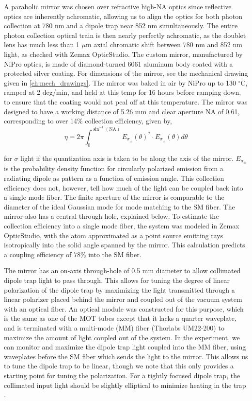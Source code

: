 A parabolic mirror was chosen over refractive high-NA optics since reflective optics are inherently achromatic, allowing us to align the optics for both photon collection at 780 nm and a dipole trap near 852 nm simultaneously. The entire photon collection optical train is then nearly perfectly achromatic, as the doublet lens has much less than 1 $\mu \mathrm{m}$ axial chromatic shift between 780 nm and 852 nm light, as checked with Zemax OpticStudio. The custom mirror, manufactured by NiPro optics, is made of diamond-turned 6061 aluminum body coated with a protected silver coating. For dimensions of the mirror, see the mechanical drawing given in \ref{ch:mech_drawings}. The mirror was baked in air by NiPro up to 130 $^{\circ}$C, ramped at 2 deg/min, and held at this temp for 16 hours before ramping down, to ensure that the coating would not peal off at this temperature. The mirror was designed to have a working distance of 5.26 mm and clear aperture NA of 0.61, corresponding to over 14$\%$ collection efficiency, given by,
\begin{equation}
    \eta = 2\pi\int_{0}^{\sin^{-1}(\text{NA})} E_{\sigma_{\pm}}(\theta)^{\ast} \cdot E_{\sigma_{\pm}}(\theta) d\theta 
\end{equation}

for $\sigma$ light if the quantization axis is taken to be along the axis of the mirror. $E_{\sigma_{\pm}}$ is the probability density function for circularly polarized emission from a radiating dipole as pattern as a function of emission angle. This collection efficiency does not, however, tell how much of the light can be coupled back into a single mode fiber. The finite aperture of the mirror is comparable to the diameter of the ideal Gaussian mode for mode matching to the SM fiber. The mirror also has a central through hole, explained below. To estimate the collection efficiency into a single mode fiber, the system was modeled in Zemax OpticStudio, with the atom approximated as a point source emitting rays isotropically into the solid angle spanned by the mirror. This calculation predicts a coupling efficiency of $78\%$ into the SM fiber.

The mirror has an on-axis through-hole of 0.5 mm diameter to allow collimated dipole trap light to pass through. This allows for tuning the degree of linear polarization of the dipole trap by maximizing the light transmitted through a linear polarizer placed behind the mirror and coupled out of the vacuum system with an optical fiber. An optical module was constructed for this purpose, which is the same as one of the MOT tubes except that it lacks a quarter waveplate, and is terminated with a multi-mode (MM) fiber (Thorlabs UM22-200) to maximize the amount of light coupled out of the system. In the experiment, we can monitor and maximize the dipole trap light coupled into the MM fiber, using waveplates before the SM fiber which sends the light to the mirror. This allows us to tune the dipole trap to be linear, though we note that this only provides a starting point for tuning the polarization. For a tightly focused dipole trap, the collimated input light should be slightly elliptical to minimize heating in the trap \cite{Garcia2018}. 

